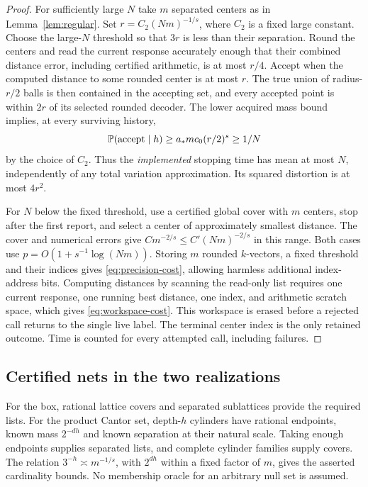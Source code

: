 \begin{proof}
For sufficiently large $N$ take $m$ separated centers as in Lemma~\ref{lem:regular}. Set $r=C_2(Nm)^{-1/s}$, where $C_2$ is a fixed large constant. Choose the large-$N$ threshold so that $3r$ is less than their separation. Round the centers and read the current response accurately enough that their combined distance error, including certified arithmetic, is at most $r/4$. Accept when the computed distance to some rounded center is at most $r$. The true union of radius-$r/2$ balls is then contained in the accepting set, and every accepted point is within $2r$ of its selected rounded decoder. The lower acquired mass bound implies, at every surviving history,
\[
 \mathbb P(\text{accept}\mid h)\ge a_*mc_0(r/2)^s\ge 1/N
\]
by the choice of $C_2$. Thus the \emph{implemented} stopping time has mean at most $N$, independently of any total variation approximation. Its squared distortion is at most $4r^2$.

For $N$ below the fixed threshold, use a certified global cover with $m$ centers, stop after the first report, and select a center of approximately smallest distance. The cover and numerical errors give $Cm^{-2/s}\le C'(Nm)^{-2/s}$ in this range. Both cases use $p=O(1+s^{-1}\log(Nm))$. Storing $m$ rounded $k$-vectors, a fixed threshold and their indices gives \eqref{eq:precision-cost}, allowing harmless additional index-address bits. Computing distances by scanning the read-only list requires one current response, one running best distance, one index, and arithmetic scratch space, which gives \eqref{eq:workspace-cost}. This workspace is erased before a rejected call returns to the single live label. The terminal center index is the only retained outcome. Time is counted for every attempted call, including failures.
\end{proof}

\subsection*{Certified nets in the two realizations}
For the box, rational lattice covers and separated sublattices provide the required lists. For the product Cantor set, depth-$h$ cylinders have rational endpoints, known mass $2^{-dh}$ and known separation at their natural scale. Taking enough endpoints supplies separated lists, and complete cylinder families supply covers. The relation $3^{-h}\asymp m^{-1/s}$, with $2^{dh}$ within a fixed factor of $m$, gives the asserted cardinality bounds. No membership oracle for an arbitrary null set is assumed.

